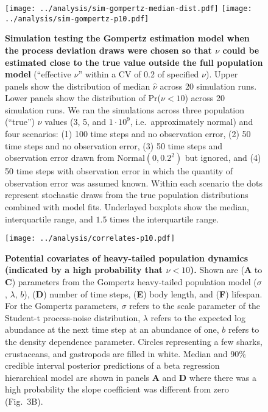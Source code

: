 \documentclass[12pt]{article}
\begin{document}
\begin{figure}[htbp]
\begin{center}
\texttt{[image: ../analysis/sim-gompertz-median-dist.pdf]}
\texttt{[image: ../analysis/sim-gompertz-p10.pdf]}

\caption{\textbf{Simulation testing the Gompertz estimation model when the process deviation draws were chosen so that $\nu$ could be estimated close to the true value outside the full population model} (``effective $\nu$'' within a CV of 0.2 of specified $\nu$). Upper panels show the distribution of median $\widehat{\nu}$ across 20 simulation runs. Lower panels show the distribution of Pr($\nu < 10$) across 20 simulation runs. We ran the simulations across three population (``true'') $\nu$ values (3, 5, and $1\cdot 10^9$, i.e.\ approximately normal) and four scenarios: (1) 100 time steps and no observation error, (2) 50 time steps and no observation error, (3) 50 time steps and observation error drawn from $\mathrm{Normal} (0, 0.2^2)$ but ignored, and (4) 50 time steps with observation error in which the quantity of observation error was assumed known. Within each scenario the dots represent stochastic draws from the true population distributions combined with model fits. Underlayed boxplots show the median, interquartile range, and $1.5$ times the interquartile range.}

\label{fig:sim-prob}
\end{center}
\end{figure}

\begin{figure}[htbp]
\begin{center}
\texttt{[image: ../analysis/correlates-p10.pdf]}

\caption{\textbf{Potential covariates of heavy-tailed population dynamics (indicated by a high probability that $\nu < 10$).} Shown are (\textbf{A} to \textbf{C}) parameters from the Gompertz heavy-tailed population model ($\sigma$, $\lambda$, $b$), (\textbf{D}) number of time steps, (\textbf{E}) body length, and (\textbf{F}) lifespan. For the Gompertz parameters, $\sigma$ refers to the scale parameter of the Student-t process-noise distribution, $\lambda$ refers to the expected log abundance at the next time step at an abundance of one, $b$ refers to the density dependence parameter. Circles representing a few sharks, crustaceans, and gastropods are filled in white. Median and 90\% credible interval posterior predictions of a beta regression hierarchical model are shown in panels \textbf{A} and \textbf{D} where there was a high probability the slope coefficient was different from zero (Fig.~3B).}

\label{fig:correlates}
\end{center}
\end{figure}
\end{document}
